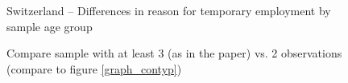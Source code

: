 \begin{figure}
    \caption{Switzerland -- Differences in reason for temporary employment by sample age group}
    \label{graph_ch_compare_sample_age}
\end{figure}

\begin{figure}
    \caption{Compare sample with at least 3 (as in the paper) vs. 2 observations (compare to figure \ref{graph_contyp})}
    \label{graph_sensitivity_compare_contyp_sample_2_years}
\end{figure}

